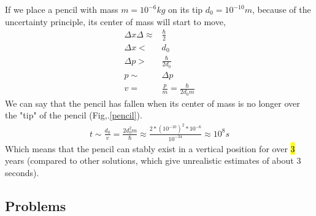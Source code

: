 			If we place a pencil with mass $m = 10^{-6}\si{kg}$ on its tip $d_0 = 10^{-10}\si{m}$, because of the uncertainty principle, its center of mass will start to move,
			\begin{align}
				\Delta x \Delta \approx& \frac{\hbar}{2} \\
				\Delta x <& d_0 \\
				\Delta p >& \frac{\hbar}{2 d_0} \\
				p \sim& \Delta p \\
				v =& \frac{p}{m} = \frac{\hbar}{2 d_0 m}
			\end{align}
			We can say that the pencil has fallen when its center of mass is no longer over the "tip" of the pencil (Fig,.\ref{pencil}).
			\begin{align}
				t \sim \frac{d_0}{v} = \frac{2d_0^2m}{\hbar} \approx \frac{2 * (10^{-10})^2 * 10^{-6}}{10^{-34}} \approx 10^8 \si{s}
			\end{align}
			Which means that the pencil can stably exist in a vertical position for over \hl{3} years (compared to other solutions, which give unrealistic estimates of about 3 seconds)\cite{easton2007quantum}.
		
	\subsection{Problems}
	